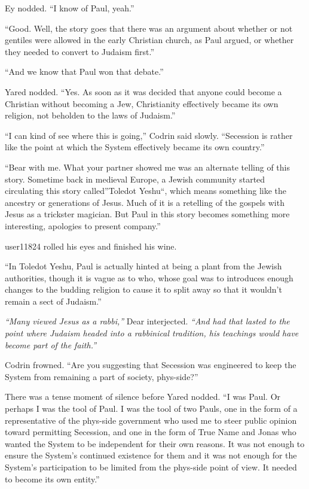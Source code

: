 Ey nodded. ``I know of Paul, yeah.''

``Good. Well, the story goes that there was an argument about whether or not gentiles were allowed in the early Christian church, as Paul argued, or whether they needed to convert to Judaism first.''

``And we know that Paul won that debate.''

Yared nodded. ``Yes. As soon as it was decided that anyone could become a Christian without becoming a Jew, Christianity effectively became its own religion, not beholden to the laws of Judaism.''

``I can kind of see where this is going,'' Codrin said slowly. ``Secession is rather like the point at which the System effectively became its own country.''

``Bear with me. What your partner showed me was an alternate telling of this story. Sometime back in medieval Europe, a Jewish community started circulating this story called''Toledot Yeshu``, which means something like the ancestry or generations of Jesus. Much of it is a retelling of the gospels with Jesus as a trickster magician. But Paul in this story becomes something more interesting, apologies to present company.''

user11824 rolled his eyes and finished his wine.

``In Toledot Yeshu, Paul is actually hinted at being a plant from the Jewish authorities, though it is vague as to who, whose goal was to introduces enough changes to the budding religion to cause it to split away so that it wouldn't remain a sect of Judaism.''

\emph{``Many viewed Jesus as a rabbi,''} Dear interjected. \emph{``And had that lasted to the point where Judaism headed into a rabbinical tradition, his teachings would have become part of the faith.''}

Codrin frowned. ``Are you suggesting that Secession was engineered to keep the System from remaining a part of society, phys-side?''

There was a tense moment of silence before Yared nodded. ``I was Paul. Or perhaps I was the tool of Paul. I was the tool of two Pauls, one in the form of a representative of the phys-side government who used me to steer public opinion toward permitting Secession, and one in the form of True Name and Jonas who wanted the System to be independent for their own reasons. It was not enough to ensure the System's continued existence for them and it was not enough for the System's participation to be limited from the phys-side point of view. It needed to become its own entity.''

